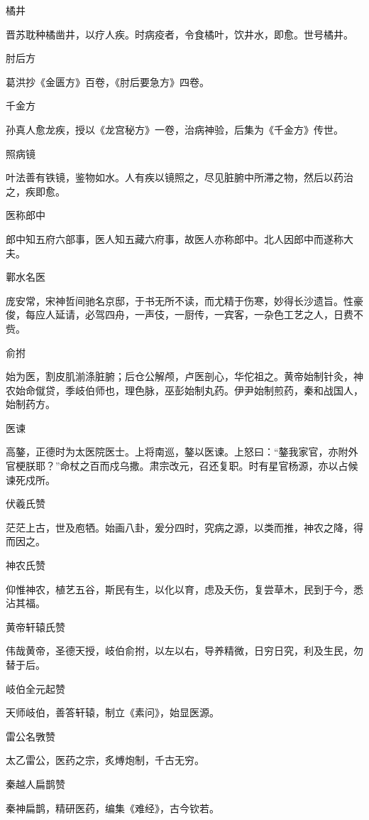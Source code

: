 \documentclass[a4paper,12pt,UTF8,twoside]{ctexbook}
\begin{document}
    橘井
    
    晋苏耽种橘凿井，以疗人疾。时病疫者，令食橘叶，饮井水，即愈。世号橘井。
    
    肘后方
    
    葛洪抄《金匮方》百卷，《肘后要急方》四卷。
    
    千金方
    
    孙真人愈龙疾，授以《龙宫秘方》一卷，治病神验，后集为《千金方》传世。
    
    照病镜
    
    叶法善有铁镜，鉴物如水。人有疾以镜照之，尽见脏腑中所滞之物，然后以药治之，疾即愈。
    
    医称郎中
    
    郎中知五府六部事，医人知五藏六府事，故医人亦称郎中。北人因郎中而遂称大夫。
    
    鄿水名医
    
    庞安常，宋神哲间驰名京邸，于书无所不读，而尤精于伤寒，妙得长沙遗旨。性豪俊，每应人延请，必驾四舟，一声伎，一厨传，一宾客，一杂色工艺之人，日费不赀。
    
    俞拊
    
    始为医，割皮肌湔涤脏腑；后仓公解颅，卢医剖心，华佗祖之。黄帝始制针灸，神农始命僦贷，季岐伯师也，理色脉，巫彭始制丸药。伊尹始制煎药，秦和战国人，始制药方。
    
    医谏
    
    高鏊，正德时为太医院医士。上将南巡，鏊以医谏。上怒曰：“鏊我家官，亦附外官梗朕耶？”命杖之百而戍乌撒。肃宗改元，召还复职。时有星官杨源，亦以占候谏死戍所。
    
    伏羲氏赞
    
    茫茫上古，世及庖牺。始画八卦，爰分四时，究病之源，以类而推，神农之降，得而因之。
    
    神农氏赞
    
    仰惟神农，植艺五谷，斯民有生，以化以育，虑及夭伤，复尝草木，民到于今，悉沾其福。
    
    黄帝轩辕氏赞
    
    伟哉黄帝，圣德天授，岐伯俞拊，以左以右，导养精微，日穷日究，利及生民，勿替于后。
    
    岐伯全元起赞
    
    天师岐伯，善答轩辕，制立《素问》，始显医源。
    
    雷公名斆赞
    
    太乙雷公，医药之宗，炙煿炮制，千古无穷。
    
    秦越人扁鹊赞
    
    秦神扁鹊，精研医药，编集《难经》，古今钦若。
    
\end{document}
